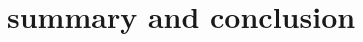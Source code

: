 \documentclass[\main/master.tex]{subfiles}
\begin{document}
\chapter{summary and conclusion}\label{chp:summary and conclusion}
\end{document}
